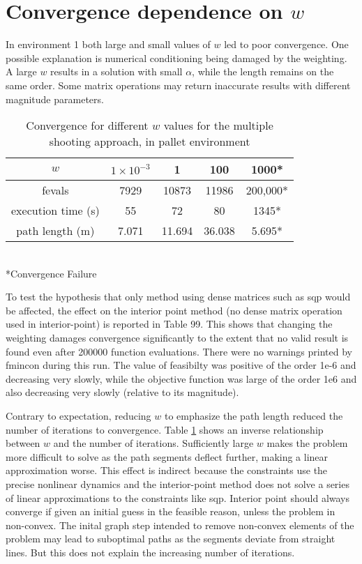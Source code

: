 \section{Convergence dependence on $w$}
In environment 1 both large and small values of $w$ led to poor convergence. One possible explanation is numerical conditioning being damaged by the weighting. A large $w$ results in a solution with small $\alpha$, while the length remains on the same order. Some matrix operations may return inaccurate results with different magnitude parameters.
\begin{table}
\begin{center}
	\begin{tabular}{ |c|c|c|c|c| }
		\hline
		 $w$ & $1\times10^{-3}$&  1 & 100 & 1000* \\ 
		 \hline
		 fevals &7929 & 10873 & 11986& 200,000* \\  
		 execution time (s)& 55 & 72 & 80 & 1345* \\
		 path length (m) & 7.071 & 11.694 & 36.038 & 5.695*\\
		 \hline  
	\end{tabular} \\
		 *Convergence Failure
\end{center}
\label{tab:w_dependence}
\caption{Convergence for different $w$ values for the multiple shooting approach, in pallet environment} 
\end{table}
To test the hypothesis that only method using dense matrices such as sqp would be affected, the effect on the interior point method (no dense matrix operation used in interior-point) is reported in Table 99. This shows that changing the weighting damages convergence significantly to the extent that no valid result is found even after 200000 function evaluations. There were no warnings printed by fmincon during this run. The value of feasibilty was positive of the order 1e-6 and decreasing very slowly, while the objective function was large of the order 1e6 and also decreasing very slowly (relative to its magnitude).

Contrary to expectation, reducing $w$ to emphasize the path length reduced the number of iterations to convergence. Table  \ref{tab:w_dependence} shows an inverse relationship between $w$ and the number of iterations. Sufficiently large $w$ makes the problem more difficult to solve as the path segments deflect further, making a linear approximation worse. This effect is indirect because the constraints use the precise nonlinear dynamics and the interior-point method does not solve a series of linear approximations to the constraints like sqp. Interior point should always converge if given an initial guess in the feasible reason, unless the problem in non-convex. The inital graph step intended to remove non-convex elements of the problem may lead to suboptimal paths as the segments deviate from straight lines. But this does not explain the increasing number of iterations. 

